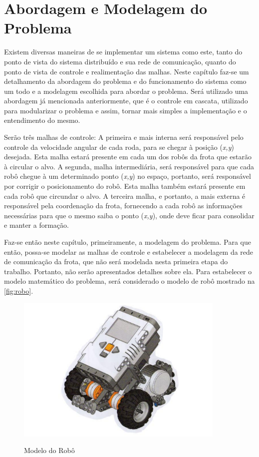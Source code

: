 %
%

\chapter{Abordagem e Modelagem do Problema}
\label{chap:abordagememdelo}
Existem diversas maneiras de se implementar um sistema como este, tanto do ponto de vista do sistema distribuído e sua rede de comunicação, quanto do ponto de vista de controle e realimentação das malhas. Neste capítulo faz-se um detalhamento da abordagem do problema e do funcionamento do sistema como um todo e a modelagem escolhida para abordar o problema. Será utilizado uma abordagem já mencionada anteriormente, que é o controle em cascata, utilizado para modularizar o problema e assim, tornar mais simples a implementação e o entendimento do mesmo. 

Serão três malhas de controle: A primeira e mais interna será responsável pelo controle da velocidade angular de cada roda, para se chegar à posição (\emph{x,y}) desejada. Esta malha estará presente em cada um dos robôs da frota que estarão à circular o alvo. A segunda, malha intermediária, será responsável para que cada robô chegue à um determinado ponto (\emph{x,y}) no espaço, portanto, será responsável por corrigir o posicionamento do robô. Esta malha também estará presente em cada robô que circundar o alvo. A terceira malha, e portanto, a mais externa é responsável pela coordenação da frota, fornecendo a cada robô as informações necessárias para que o mesmo saiba o ponto (\emph{x,y}), onde deve ficar para consolidar e manter a formação.

Faz-se então neste capítulo, primeiramente, a modelagem do problema. Para que então, possa-se modelar as malhas de controle e estabelecer a modelagem da rede de comunicação da frota, que não será modelada nesta primeira etapa do trabalho. Portanto, não serão apresentados detalhes sobre ela. Para estabelecer o modelo matemático do problema, será considerado o modelo de robô mostrado na \autoref{fig:robo}.

\begin{figure}[!htb]
	\centering
	\caption{Modelo do Robô}
	\includegraphics[width=10cm]{./04-figuras/robo}
	\label{fig:robo}
\end{figure}
 

